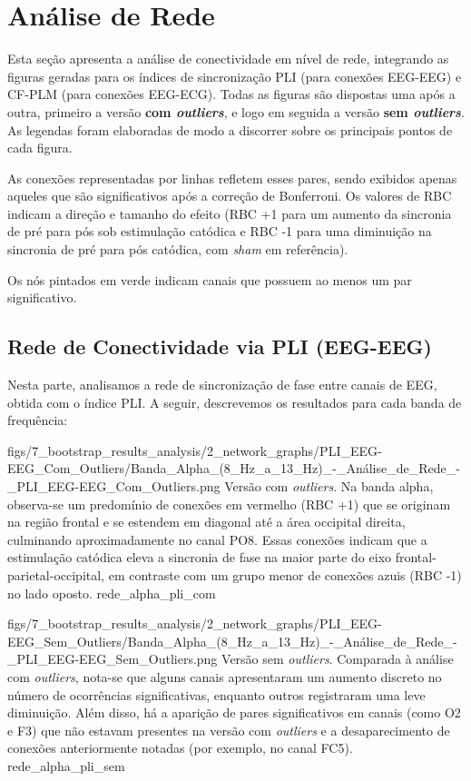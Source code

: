 \chapter{Análise de Rede}
\label{chap:analise_de_rede}
Esta seção apresenta a análise de conectividade em nível de rede, integrando as figuras geradas para os índices de sincronização PLI (para conexões EEG-EEG) e CF-PLM (para conexões EEG-ECG). Todas as figuras são dispostas uma após a outra, primeiro a versão \textbf{com \textit{outliers}}, e logo em seguida a versão \textbf{sem \textit{outliers}}. As legendas foram elaboradas de modo a discorrer sobre os principais pontos de cada figura. 

As conexões representadas por linhas refletem esses pares, sendo exibidos apenas aqueles que são significativos após a correção de Bonferroni. Os valores de RBC indicam a direção e tamanho do efeito (RBC +1 para um aumento da sincronia de pré para pós sob estimulação catódica e RBC -1 para uma diminuição na sincronia de pré para pós catódica, com \textit{sham} em referência).

Os nós pintados em verde indicam canais que possuem ao menos um par significativo.

\section{Rede de Conectividade via PLI (EEG-EEG)}
Nesta parte, analisamos a rede de sincronização de fase entre canais de EEG, obtida com o índice PLI.  A seguir, descrevemos os resultados para cada banda de frequência:

\smallfigure
{figs/7_bootstrap_results_analysis/2_network_graphs/PLI_EEG-EEG_Com_Outliers/Banda_Alpha_(8_Hz_a_13_Hz)_-_Análise_de_Rede_-_PLI_EEG-EEG_Com_Outliers.png}
{Versão com \textit{outliers}. Na banda alpha, observa-se um predomínio de conexões em vermelho (RBC +1) que se originam na região frontal e se estendem em diagonal até a área occipital direita, culminando aproximadamente no canal PO8. Essas conexões indicam que a estimulação catódica eleva a sincronia de fase na maior parte do eixo frontal-parietal-occipital, em contraste com um grupo menor de conexões azuis (RBC -1) no lado oposto.}
{rede_alpha_pli_com}

\smallfigure
{figs/7_bootstrap_results_analysis/2_network_graphs/PLI_EEG-EEG_Sem_Outliers/Banda_Alpha_(8_Hz_a_13_Hz)_-_Análise_de_Rede_-_PLI_EEG-EEG_Sem_Outliers.png}
{Versão sem \textit{outliers}. Comparada à análise com \textit{outliers}, nota-se que alguns canais apresentaram um aumento discreto no número de ocorrências significativas, enquanto outros registraram uma leve diminuição. Além disso, há a aparição de pares significativos em canais (como O2 e F3) que não estavam presentes na versão com \textit{outliers} e a desaparecimento de conexões anteriormente notadas (por exemplo, no canal FC5).}
{rede_alpha_pli_sem}

